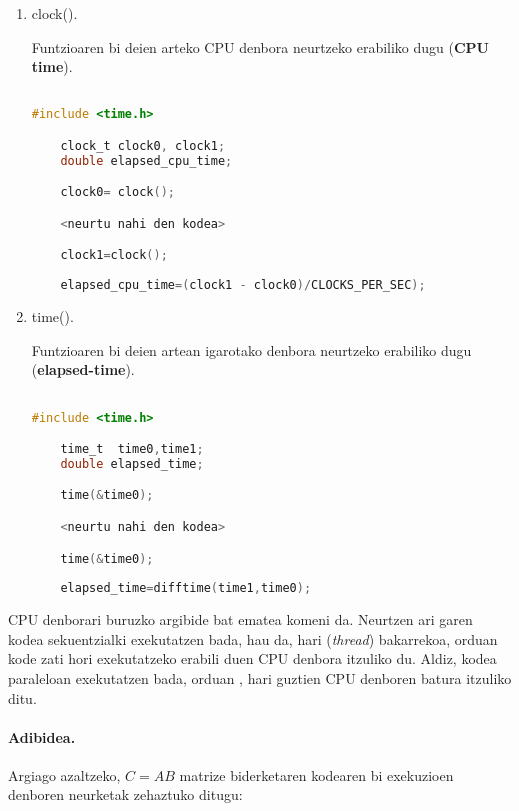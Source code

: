 \begin{enumerate}
\item clock().

Funtzioaren bi deien arteko CPU denbora neurtzeko erabiliko dugu (\textbf{CPU time}).

\begin{lstlisting}[language=C]

#include <time.h>

    clock_t clock0, clock1; 
    double elapsed_cpu_time;

    clock0= clock();

    <neurtu nahi den kodea>

    clock1=clock();
    
    elapsed_cpu_time=(clock1 - clock0)/CLOCKS_PER_SEC);

\end{lstlisting}

\item time().

Funtzioaren bi deien artean igarotako denbora neurtzeko erabiliko dugu (\textbf{elapsed-time}).

\begin{lstlisting}[language=C]

#include <time.h>

    time_t  time0,time1;
    double elapsed_time;

    time(&time0);

    <neurtu nahi den kodea>

    time(&time0);
    
    elapsed_time=difftime(time1,time0);

\end{lstlisting}

\end{enumerate}

CPU denborari buruzko argibide bat ematea komeni da. Neurtzen ari garen kodea sekuentzialki exekutatzen bada, hau da, hari (\emph{thread}) bakarrekoa, orduan kode zati hori exekutatzeko erabili duen CPU denbora itzuliko du. Aldiz, kodea paraleloan exekutatzen bada, orduan , hari guztien CPU denboren batura itzuliko ditu. 


\paragraph*{Adibidea.} Argiago azaltzeko, $C=AB$ matrize biderketaren kodearen bi exekuzioen denboren neurketak zehaztuko ditugu:

